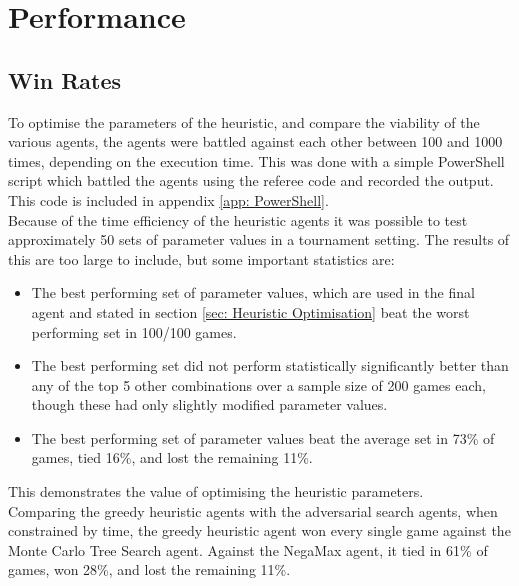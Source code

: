 \documentclass{article}
\begin{document}
\section{Performance}
\subsection{Win Rates}
\label{sec: Win Rates}
To optimise the parameters of the heuristic, and compare the viability of the various agents, the agents were battled against each other between 100 and 1000 times, depending on the execution time. This was done with a simple PowerShell script which battled the agents using the referee code and recorded the output. This code is included in appendix \ref{app: PowerShell}.\\[2mm]
Because of the time efficiency of the heuristic agents it was possible to test approximately 50 sets of parameter values in a tournament setting. The results of this are too large to include, but some important statistics are:
\begin{itemize}
    \item The best performing set of parameter values, which are used in the final agent and stated in section \ref{sec: Heuristic Optimisation} beat the worst performing set in 100/100 games.
    \item The best performing set did not perform statistically significantly better than any of the top 5 other combinations over a sample size of 200 games each, though these had only slightly modified parameter values.
    \item The best performing set of parameter values beat the average set in 73\% of games, tied 16\%, and lost the remaining 11\%.
\end{itemize}
This demonstrates the value of optimising the heuristic parameters.\\[2mm]
Comparing the greedy heuristic agents with the adversarial search agents, when constrained by time, the greedy heuristic agent won every single game against the Monte Carlo Tree Search agent. Against the NegaMax agent, it tied in 61\% of games, won 28\%, and lost the remaining 11\%. 
\end{document}
